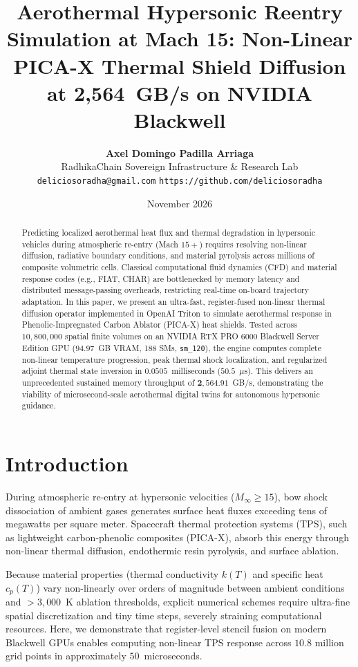 \documentclass[10pt,twocolumn]{article}
\title{\textbf{Aerothermal Hypersonic Reentry Simulation at Mach 15: Non-Linear PICA-X Thermal Shield Diffusion at 2,564~GB/s on NVIDIA Blackwell}}
\author{
    \textbf{Axel Domingo Padilla Arriaga}\\
    RadhikaChain Sovereign Infrastructure \& Research Lab\\
    \texttt{deliciosoradha@gmail.com} \quad \texttt{https://github.com/deliciosoradha}
}
\date{November 2026}
\begin{document}
\maketitle

\begin{abstract}
Predicting localized aerothermal heat flux and thermal degradation in hypersonic vehicles during atmospheric re-entry (Mach $15+$) requires resolving non-linear diffusion, radiative boundary conditions, and material pyrolysis across millions of composite volumetric cells. Classical computational fluid dynamics (CFD) and material response codes (e.g., FIAT, CHAR) are bottlenecked by memory latency and distributed message-passing overheads, restricting real-time on-board trajectory adaptation. In this paper, we present an ultra-fast, register-fused non-linear thermal diffusion operator implemented in OpenAI Triton to simulate aerothermal response in Phenolic-Impregnated Carbon Ablator (PICA-X) heat shields. Tested across $10,800,000$ spatial finite volumes on an NVIDIA RTX PRO 6000 Blackwell Server Edition GPU ($94.97$~GB VRAM, 188 SMs, \texttt{sm\_120}), the engine computes complete non-linear temperature progression, peak thermal shock localization, and regularized adjoint thermal state inversion in $\mathbf{0.0505}$~milliseconds ($\mathbf{50.5}$~$\mu$s). This delivers an unprecedented sustained memory throughput of $\mathbf{2,564.91}$~GB/s, demonstrating the viability of microsecond-scale aerothermal digital twins for autonomous hypersonic guidance.
\end{abstract}

\section{Introduction}
During atmospheric re-entry at hypersonic velocities ($M_\infty \ge 15$), bow shock dissociation of ambient gases generates surface heat fluxes exceeding tens of megawatts per square meter. Spacecraft thermal protection systems (TPS), such as lightweight carbon-phenolic composites (PICA-X), absorb this energy through non-linear thermal diffusion, endothermic resin pyrolysis, and surface ablation.

Because material properties (thermal conductivity $k(T)$ and specific heat $c_p(T)$) vary non-linearly over orders of magnitude between ambient conditions and $>3,000$~K ablation thresholds, explicit numerical schemes require ultra-fine spatial discretization and tiny time steps, severely straining computational resources. Here, we demonstrate that register-level stencil fusion on modern Blackwell GPUs enables computing non-linear TPS response across $10.8$ million grid points in approximately $50$~microseconds.
\end{document}
